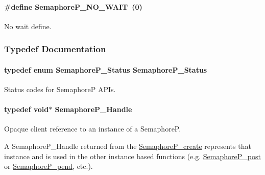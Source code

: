 \paragraph[{Semaphore\+P\+\_\+\+N\+O\+\_\+\+W\+A\+I\+T}]{\setlength{\rightskip}{0pt plus 5cm}\#define Semaphore\+P\+\_\+\+N\+O\+\_\+\+W\+A\+I\+T~(0)}\label{_semaphore_p_8h_a39cd521223b38fd00a334c57929c67c7}


No wait define. 



\subsubsection{Typedef Documentation}
\paragraph[{Semaphore\+P\+\_\+\+Status}]{\setlength{\rightskip}{0pt plus 5cm}typedef enum {\bf Semaphore\+P\+\_\+\+Status}  {\bf Semaphore\+P\+\_\+\+Status}}\label{_semaphore_p_8h_abec0378f2d6838c402bbe0bfa155c170}


Status codes for Semaphore\+P A\+P\+Is. 

\paragraph[{Semaphore\+P\+\_\+\+Handle}]{\setlength{\rightskip}{0pt plus 5cm}typedef void$\ast$ {\bf Semaphore\+P\+\_\+\+Handle}}\label{_semaphore_p_8h_a7f34865f33e666455692544e5f12d1f2}


Opaque client reference to an instance of a Semaphore\+P. 

A Semaphore\+P\+\_\+\+Handle returned from the \hyperlink{_semaphore_p_8h_a3fd837348befa046554496e8da2a1fac}{Semaphore\+P\+\_\+create} represents that instance and is used in the other instance based functions (e.\+g. \hyperlink{_semaphore_p_8h_aae0a3a615ec693fc13da14ebaec9df9b}{Semaphore\+P\+\_\+post} or \hyperlink{_semaphore_p_8h_a375d7e0596970995eaa2c2bc77d7acb3}{Semaphore\+P\+\_\+pend}, etc.). 
